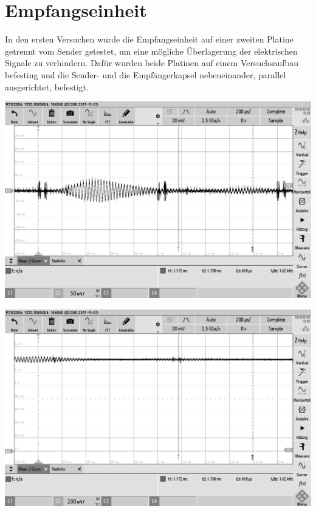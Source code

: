 \section{Empfangseinheit}
In den ersten Versuchen wurde die Empfangseinheit auf einer zweiten Platine getrennt vom Sender getestet, um eine mögliche Überlagerung der elektrischen Signale zu verhindern. Dafür wurden beide Platinen auf einem Versuchsaufbau befesting und die Sender- und die Empfängerkapsel nebeneinander, parallel ausgerichtet, befestigt.\\
\begin{minipage}{0.5\textwidth}
\includegraphics[width=1\textwidth, draft]{Abbildungen/Signal-Empfang.png}
\label{fig:Empfang am LS}
\end{minipage}
\begin{minipage}{0.5\textwidth}
\includegraphics[width=1\textwidth, draft]{Abbildungen/Signal-nach-der-Filterung.png}
\label{fig:Filterung}
\end{minipage}

